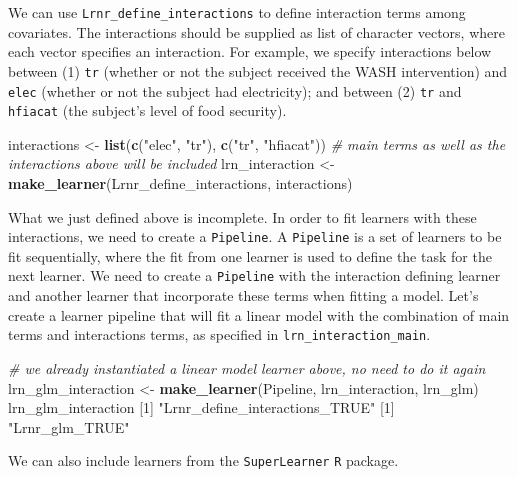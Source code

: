 \documentclass[12pt, krantz2,]{krantz}
\newenvironment{Shaded}{\begin{snugshade}}{\end{snugshade}}
\newcommand{\CommentTok}[1]{\textcolor[rgb]{0.37,0.37,0.37}{\textit{#1}}}
\newcommand{\DecValTok}[1]{\textcolor[rgb]{0.06,0.06,0.06}{#1}}
\newcommand{\KeywordTok}[1]{\textcolor[rgb]{0.27,0.27,0.27}{\textbf{#1}}}
\newcommand{\NormalTok}[1]{#1}
\newcommand{\StringTok}[1]{\textcolor[rgb]{0.5,0.5,0.5}{#1}}
\theoremstyle{definition}
\theoremstyle{definition}
\theoremstyle{definition}
\newcommand{\1}{\mathbbm{1}}
\begin{document}
We can use \texttt{Lrnr\_define\_interactions} to define interaction terms among
covariates. The interactions should be supplied as list of character vectors,
where each vector specifies an interaction. For example, we specify
interactions below between (1) \texttt{tr} (whether or not the subject received the
WASH intervention) and \texttt{elec} (whether or not the subject had electricity); and
between (2) \texttt{tr} and \texttt{hfiacat} (the subject's level of food security).

\begin{Shaded}
\begin{Highlighting}[]
\NormalTok{interactions <-}\StringTok{ }\KeywordTok{list}\NormalTok{(}\KeywordTok{c}\NormalTok{(}\StringTok{"elec"}\NormalTok{, }\StringTok{"tr"}\NormalTok{), }\KeywordTok{c}\NormalTok{(}\StringTok{"tr"}\NormalTok{, }\StringTok{"hfiacat"}\NormalTok{))}
\CommentTok{# main terms as well as the interactions above will be included}
\NormalTok{lrn_interaction <-}\StringTok{ }\KeywordTok{make_learner}\NormalTok{(Lrnr_define_interactions, interactions)}
\end{Highlighting}
\end{Shaded}

What we just defined above is incomplete. In order to fit learners with these
interactions, we need to create a \texttt{Pipeline}. A \texttt{Pipeline} is a set of learners
to be fit sequentially, where the fit from one learner is used to define the
task for the next learner. We need to create a \texttt{Pipeline} with the interaction
defining learner and another learner that incorporate these terms when fitting
a model. Let's create a learner pipeline that will fit a linear model with the
combination of main terms and interactions terms, as specified in
\texttt{lrn\_interaction\_main}.

\begin{Shaded}
\begin{Highlighting}[]
\CommentTok{# we already instantiated a linear model learner above, no need to do it again}
\NormalTok{lrn_glm_interaction <-}\StringTok{ }\KeywordTok{make_learner}\NormalTok{(Pipeline, lrn_interaction, lrn_glm)}
\NormalTok{lrn_glm_interaction}
\NormalTok{[}\DecValTok{1}\NormalTok{] }\StringTok{"Lrnr_define_interactions_TRUE"}
\NormalTok{[}\DecValTok{1}\NormalTok{] }\StringTok{"Lrnr_glm_TRUE"}
\end{Highlighting}
\end{Shaded}

We can also include learners from the \texttt{SuperLearner} \texttt{R} package.
\end{document}
